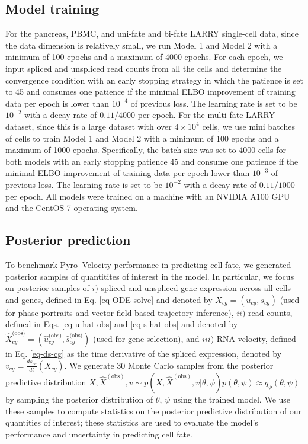 \documentclass[
  sn-mathphys-num,
  lineno,
  twocolumn]{sn-jnl}
\begin{document}
\subsection{Model training}\label{sec-methods-training}

For the pancreas, PBMC, and uni-fate and bi-fate LARRY single-cell data,
since the data dimension is relatively small, we run Model 1 and Model 2
with a minimum of 100 epochs and a maximum of 4000 epochs. For each
epoch, we input spliced and unspliced read counts from all the cells and
determine the convergence condition with an early stopping strategy in
which the patience is set to 45 and consumes one patience if the minimal
ELBO improvement of training data per epoch is lower than \(10^{-4}\) of
previous loss. The learning rate is set to be \(10^{-2}\) with a decay
rate of \(0.11/4000\) per epoch. For the multi-fate LARRY dataset, since
this is a large dataset with over \(4 \times
10^4\) cells, we use mini batches of cells to train Model 1 and Model 2
with a minimum of 100 epochs and a maximum of 1000 epochs. Specifically,
the batch size was set to 4000 cells for both models with an early
stopping patience 45 and consume one patience if the minimal ELBO
improvement of training data per epoch lower than \(10^{-3}\) of
previous loss. The learning rate is set to be \(10^{-2}\) with a decay
rate of \(0.11/1000\) per epoch. All models were trained on a machine
with an NVIDIA A100 GPU and the CentOS 7 operating system.

\subsection{Posterior
prediction}\label{sec-methods-posterior-prediction}

To benchmark Pyro -Velocity performance in predicting cell fate, we
generated posterior samples of quantitites of interest in the model. In
particular, we focus on posterior samples of \(i)\) spliced and
unspliced gene expression across all cells and genes, defined in Eq.
\ref{eq-ODE-solve} and denoted by
\(X_{cg}=\left(u_{cg}, s_{cg} \right)\) (used for phase portraits and
vector-field-based trajectory inference), \(ii)\) read counts, defined
in Eqs. \ref{eq-u-hat-obs} and \ref{eq-s-hat-obs} and denoted by
\(\hat{X}^{\text{(obs)}}_{cg}=\left(\hat{u}^{\text{(obs)}}_{cg}, \hat{s}^{\text{(obs)}}_{cg} \right)\)
(used for gene selection), and \(iii)\) RNA velocity, defined in Eq.
\ref{eq-ds-cg} as the time derivative of the spliced expression, denoted
by \(v_{cg}=\frac{ds_{cg}}{d t}(X_{cg})\). We generate 30 Monte Carlo
samples from the posterior predictive distribution
\(X, \hat{X}^{(\text{obs})}, v \sim p(X, \hat{X}^{(\text{obs})}, v \vert \theta, \psi) p(\theta, \psi) \approx q_{\phi}(\theta, \psi)\)
by sampling the posterior distribution of \(\theta\), \(\psi\) using the
trained model. We use these samples to compute statistics on the
posterior predictive distribution of our quantities of interest; these
statistics are used to evaluate the model's performance and uncertainty
in predicting cell fate.
\end{document}
